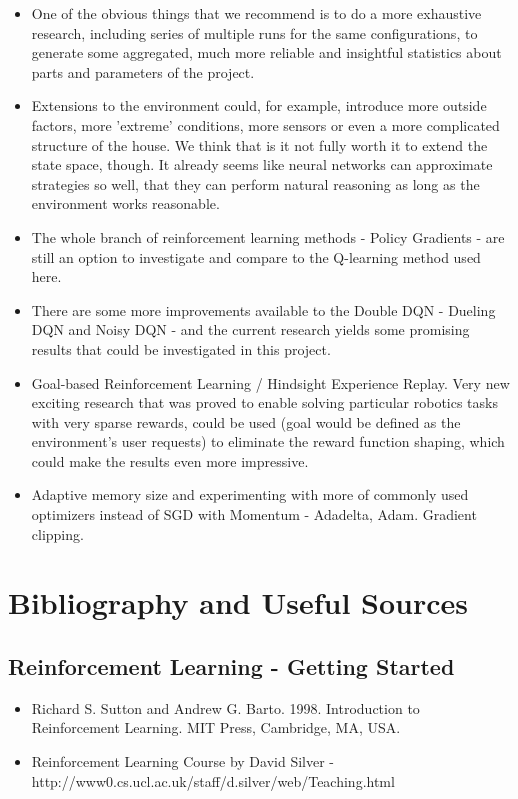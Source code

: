\documentclass{article}
\begin{document}
\begin{itemize}
\item One of the obvious things that we recommend is to do a more exhaustive research, including series of multiple runs for the same configurations, to generate some aggregated, much more reliable and insightful statistics about parts and parameters of the project.

\item Extensions to the environment could, for example, introduce more outside factors, more 'extreme' conditions, more sensors or even a more complicated structure of the house. We think that is it not fully worth it to extend the state space, though. It already seems like neural networks can approximate strategies so well, that they can perform natural reasoning as long as the environment works reasonable.

\item The whole branch of reinforcement learning methods - Policy Gradients - are still an option to investigate and compare to the Q-learning method used here. 

\item There are some more improvements available to the Double DQN - Dueling DQN and Noisy DQN - and the current research yields some promising results that could be investigated in this project.

\item Goal-based Reinforcement Learning / Hindsight Experience Replay. Very new exciting research that was proved to enable solving particular robotics tasks with very sparse rewards, could be used (goal would be defined as the environment's user requests) to eliminate the reward function shaping, which could make the results even more impressive.

\item Adaptive memory size and experimenting with more of commonly used optimizers instead of SGD with Momentum - Adadelta, Adam. Gradient clipping. 

\end{itemize}
\newpage
\section{Bibliography and Useful Sources}
\subsection{Reinforcement Learning - Getting Started}
\begin{itemize}
\item Richard S. Sutton and Andrew G. Barto. 1998. Introduction to Reinforcement Learning. MIT Press, Cambridge, MA, USA.
\item Reinforcement Learning Course by David Silver - http://www0.cs.ucl.ac.uk/staff/d.silver/web/Teaching.html
\end{itemize}
\end{document}
